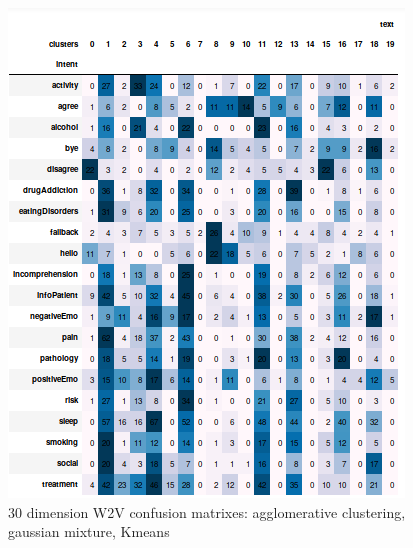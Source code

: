 \documentclass[11pt]{article}
\begin{document}
\begin{figure}[h]
	\includegraphics[scale=0.28]{w2v30_km.png}
	\caption{30 dimension W2V confusion matrixes: agglomerative clustering, gaussian mixture, Kmeans}
\label{w2v30_cm}
\end{figure}
\FloatBarrier
\end{document}
